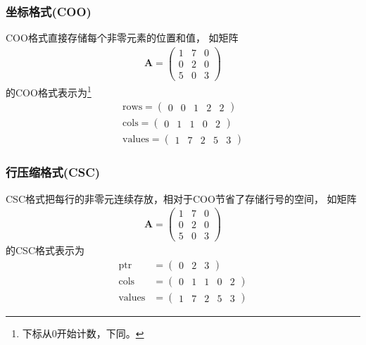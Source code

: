 \subsubsection{坐标格式(COO)}
COO格式直接存储每个非零元素的位置和值，
如矩阵
\begin{align*}
\bm{A}=\begin{pmatrix}
1 & 7 & 0\\
0 & 2 & 0\\
5 & 0 & 3
\end{pmatrix}
\end{align*}
的COO格式表示为\footnote{下标从0开始计数，下同。}
\begin{align*}
\mathrm{rows}=\begin{pmatrix}
0 & 0 & 1 & 2 & 2  
\end{pmatrix}
\\
\mathrm{cols}=\begin{pmatrix}
0 & 1 & 1 & 0 & 2
\end{pmatrix}
\\
\mathrm{values}=\begin{pmatrix}
1 & 7 & 2 & 5 & 3
\end{pmatrix}
\end{align*}



\subsubsection{行压缩格式(CSC)}
CSC格式把每行的非零元连续存放，相对于COO节省了存储行号的空间，
如矩阵
\begin{align*}
\bm{A}=\begin{pmatrix}
1 & 7 & 0\\
0 & 2 & 0\\
5 & 0 & 3
\end{pmatrix}
\end{align*}
的CSC格式表示为
\begin{align*}
\mathrm{ptr}&=\begin{pmatrix}
0 & 2 & 3  
\end{pmatrix}
\\
\mathrm{cols}&=\begin{pmatrix}
0 & 1 & 1 & 0 & 2
\end{pmatrix}
\\
\mathrm{values}&=\begin{pmatrix}
1 & 7 & 2 & 5 & 3
\end{pmatrix}
\end{align*}

